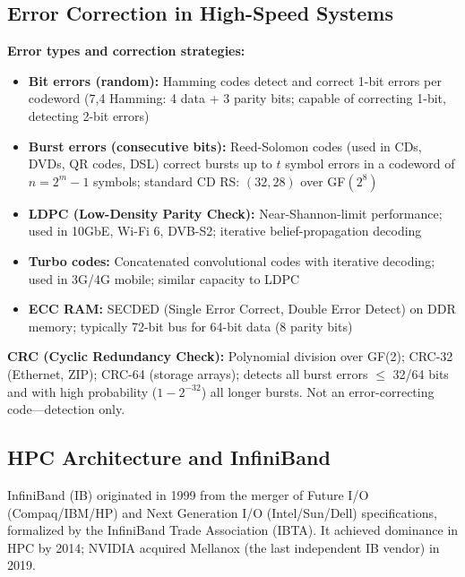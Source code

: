 \documentclass[11pt,letterpaper]{article}
\begin{document}
\subsection{Error Correction in High-Speed Systems}

\textbf{Error types and correction strategies:}

\begin{itemize}[noitemsep]
  \item \textbf{Bit errors (random):} Hamming codes detect and correct 1-bit errors per codeword (7,4 Hamming: 4 data + 3 parity bits; capable of correcting 1-bit, detecting 2-bit errors)
  \item \textbf{Burst errors (consecutive bits):} Reed-Solomon codes (used in CDs, DVDs, QR codes, DSL) correct bursts up to $t$ symbol errors in a codeword of $n = 2^m - 1$ symbols; standard CD RS: $(32, 28)$ over GF$(2^8)$
  \item \textbf{LDPC (Low-Density Parity Check):} Near-Shannon-limit performance; used in 10GbE, Wi-Fi 6, DVB-S2; iterative belief-propagation decoding
  \item \textbf{Turbo codes:} Concatenated convolutional codes with iterative decoding; used in 3G/4G mobile; similar capacity to LDPC
  \item \textbf{ECC RAM:} SECDED (Single Error Correct, Double Error Detect) on DDR memory; typically 72-bit bus for 64-bit data (8 parity bits)
\end{itemize}

\textbf{CRC (Cyclic Redundancy Check):} Polynomial division over GF(2); CRC-32 (Ethernet, ZIP); CRC-64 (storage arrays); detects all burst errors $\le$ 32/64 bits and with high probability ($1-2^{-32}$) all longer bursts. Not an error-correcting code---detection only.

\subsection{HPC Architecture and InfiniBand}

InfiniBand (IB) originated in 1999 from the merger of Future I/O (Compaq/IBM/HP) and Next Generation I/O (Intel/Sun/Dell) specifications, formalized by the InfiniBand Trade Association (IBTA). It achieved dominance in HPC by 2014; NVIDIA acquired Mellanox (the last independent IB vendor) in 2019.
\end{document}
